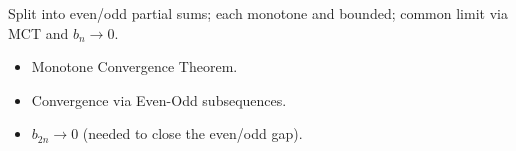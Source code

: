 \begin{remark*}
Split into even/odd partial sums; each monotone and bounded; common limit via MCT and $b_n \to 0$.
\end{remark*}

\begin{remark*}[Dependencies]
\begin{itemize}
  \item Monotone Convergence Theorem.
  \item Convergence via Even-Odd subsequences.
  \item $b_{2n} \to 0$ (needed to close the even/odd gap).
\end{itemize}
\end{remark*}
